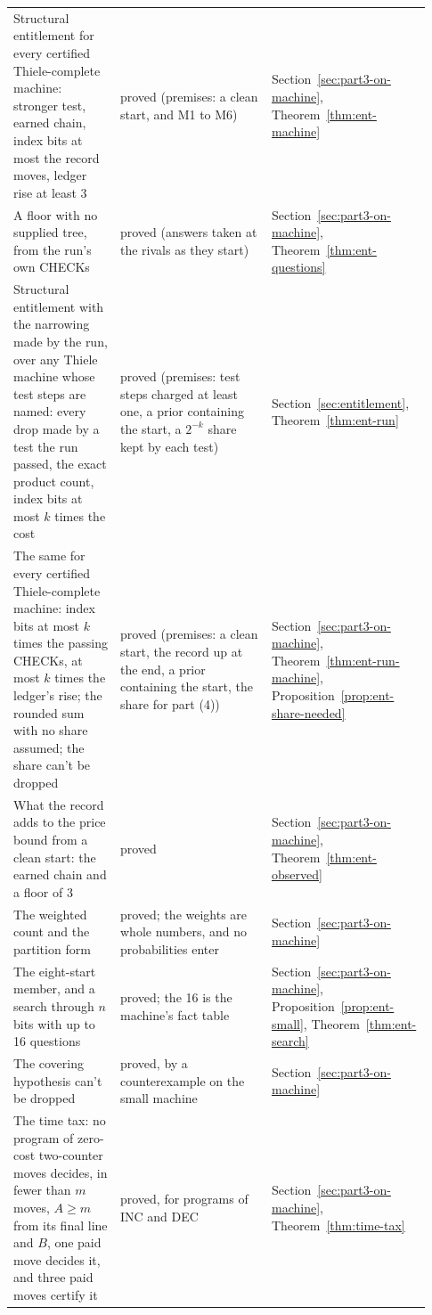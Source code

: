 \documentclass[11pt,twoside]{article}
\theoremstyle{thielethm}
\theoremstyle{thieledef}
\theoremstyle{thieledef}
\theoremstyle{thieledef}
\theoremstyle{thielethm}
\theoremstyle{thieleobs}
\theoremstyle{thielethm}
\begin{document}
\begin{longtable}{@{}>{\raggedright\arraybackslash}p{0.242\linewidth}>{\raggedright\arraybackslash}p{0.344\linewidth}>{\raggedright\arraybackslash}p{0.344\linewidth}@{}}
Structural entitlement for every certified Thiele-complete machine: stronger test, earned chain, index bits at most the record moves, ledger rise at least 3 & proved (premises: a clean start, and M1 to M6) & Section~\ref{sec:part3-on-machine}, Theorem~\ref{thm:ent-machine} \\
A floor with no supplied tree, from the run's own CHECKs & proved (answers taken at the rivals as they start) & Section~\ref{sec:part3-on-machine}, Theorem~\ref{thm:ent-questions} \\
Structural entitlement with the narrowing made by the run, over any Thiele machine whose test steps are named: every drop made by a test the run passed, the exact product count, index bits at most $k$ times the cost & proved (premises: test steps charged at least one, a prior containing the start, a $2^{-k}$ share kept by each test) & Section~\ref{sec:entitlement}, Theorem~\ref{thm:ent-run} \\
The same for every certified Thiele-complete machine: index bits at most $k$ times the passing CHECKs, at most $k$ times the ledger's rise; the rounded sum with no share assumed; the share can't be dropped & proved (premises: a clean start, the record up at the end, a prior containing the start, the share for part (4)) & Section~\ref{sec:part3-on-machine}, Theorem~\ref{thm:ent-run-machine}, Proposition~\ref{prop:ent-share-needed} \\
What the record adds to the price bound from a clean start: the earned chain and a floor of 3 & proved & Section~\ref{sec:part3-on-machine}, Theorem~\ref{thm:ent-observed} \\
The weighted count and the partition form & proved; the weights are whole numbers, and no probabilities enter & Section~\ref{sec:part3-on-machine} \\
The eight-start member, and a search through $n$ bits with up to 16 questions & proved; the 16 is the machine's fact table & Section~\ref{sec:part3-on-machine}, Proposition~\ref{prop:ent-small}, Theorem~\ref{thm:ent-search} \\
The covering hypothesis can't be dropped & proved, by a counterexample on the small machine & Section~\ref{sec:part3-on-machine} \\
The time tax: no program of zero-cost two-counter moves decides, in fewer than $m$ moves, $A \ge m$ from its final line and $B$, one paid move decides it, and three paid moves certify it & proved, for programs of INC and DEC & Section~\ref{sec:part3-on-machine}, Theorem~\ref{thm:time-tax} \\

\end{longtable}
\end{document}
